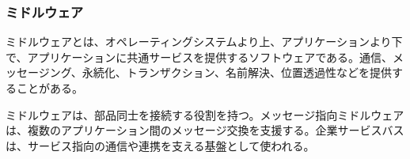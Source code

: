 \subsubsection{ミドルウェア}

ミドルウェアとは、オペレーティングシステムより上、アプリケーションより下で、アプリケーションに共通サービスを提供するソフトウェアである。通信、メッセージング、永続化、トランザクション、名前解決、位置透過性などを提供することがある。

ミドルウェアは、部品同士を接続する役割を持つ。メッセージ指向ミドルウェアは、複数のアプリケーション間のメッセージ交換を支援する。企業サービスバスは、サービス指向の通信や連携を支える基盤として使われる。
